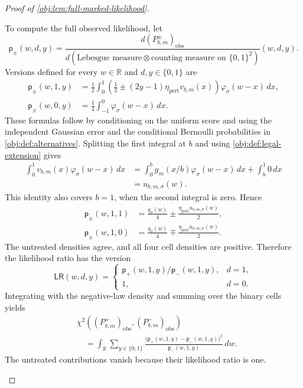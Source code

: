 \documentclass[11pt]{article}
\begin{document}
\begin{proof}[Proof of \cref{obj:lem:full-marked-likelihood}]
\begin{enumerate}
To compute the full observed likelihood, let
\[
\mathsf p_\pm(w,d,y)
=
\frac{d(P^\pm_{b,m})_{\mathrm{obs}}}
     {d(\text{Lebesgue measure}\otimes\text{counting measure on }\{0,1\}^2)}
     (w,d,y).
\]
Versions defined for every \(w\in\mathbb R\) and \(d,y\in\{0,1\}\) are
\[
\begin{aligned}
\mathsf p_\pm(w,1,y)
&=\frac12\int_0^1
 \left(\frac12\pm(2y-1)\eta_{\mathrm{pert}}v_{b,m}(x)\right)
 \varphi_\sigma(w-x)\,dx,\\
\mathsf p_\pm(w,0,y)
&=\frac14\int_{-1}^0\varphi_\sigma(w-x)\,dx.
\end{aligned}
\]
These formulas follow by conditioning on the uniform score and using the independent Gaussian error and the conditional Bernoulli probabilities in \cref{obj:def:alternatives}. Splitting the first integral at \(b\) and using \cref{obj:def:legal-extension} gives
\[
\begin{aligned}
\int_0^1v_{b,m}(x)\varphi_\sigma(w-x)\,dx
&=\int_0^bg_m(x/b)\varphi_\sigma(w-x)\,dx
  +\int_b^1 0\,dx\\
&=u_{b,m,\sigma}(w).
\end{aligned}
\]
This identity also covers \(b=1\), when the second integral is zero. Hence
\[
\begin{aligned}
\mathsf p_\pm(w,1,1)
&=\frac{q_\sigma(w)}4
  \pm\frac{\eta_{\mathrm{pert}}u_{b,m,\sigma}(w)}2,\\
\mathsf p_\pm(w,1,0)
&=\frac{q_\sigma(w)}4
  \mp\frac{\eta_{\mathrm{pert}}u_{b,m,\sigma}(w)}2.
\end{aligned}
\]
The untreated densities agree, and all four cell densities are positive. Therefore the likelihood ratio has the version
\[
\mathsf{LR}(w,d,y)
=
\begin{cases}
\mathsf p_+(w,1,y)/\mathsf p_-(w,1,y),&d=1,\\
1,&d=0.
\end{cases}
\]
Integrating with the negative-law density and summing over the binary cells yields
\[
\begin{aligned}
&\chi^2\!\left((P^+_{b,m})_{\mathrm{obs}},
              (P^-_{b,m})_{\mathrm{obs}}\right)\\
&\quad=
\int_{\mathbb R}\sum_{y\in\{0,1\}}
\frac{\bigl(\mathsf p_+(w,1,y)-\mathsf p_-(w,1,y)\bigr)^2}
     {\mathsf p_-(w,1,y)}\,dw.
\end{aligned}
\]
The untreated contributions vanish because their likelihood ratio is one.


\end{enumerate}
\end{proof}
\end{document}
